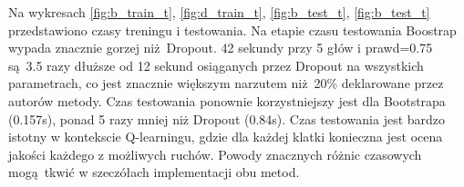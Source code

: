 \begin{figure}[H]
	\begin{floatrow}
	\end{floatrow}
\end{figure}

Na wykresach \ref{fig:b_train_t}, \ref{fig:d_train_t}, \ref{fig:b_test_t}, \ref{fig:b_test_t} przedstawiono czasy treningu i testowania. Na etapie czasu testowania Boostrap wypada znacznie gorzej niż Dropout. 42 sekundy przy 5 głów i prawd=0.75 są 3.5 razy dłuższe od 12 sekund osiąganych przez Dropout na wszystkich parametrach, co jest znacznie większym narzutem niż 20\% deklarowane przez autorów metody.
Czas testowania ponownie korzystniejszy jest dla Bootstrapa (0.157s), ponad 5 razy mniej niż Dropout (0.84s). Czas testowania jest bardzo istotny w kontekscie Q-learningu, gdzie dla każdej klatki konieczna jest ocena jakości każdego z możliwych ruchów. 
Powody znacznych różnic czasowych mogą tkwić w szeczółach implementacji obu metod. 

